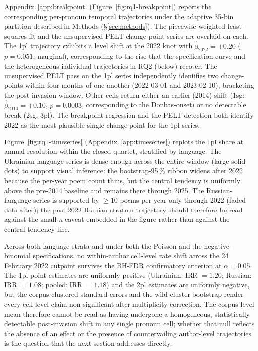 \documentclass[12pt]{interact}
\theoremstyle{plain}%
\theoremstyle{definition}
\theoremstyle{remark}
\begin{document}
Appendix~\ref{app:breakpoint} (Figure~\ref{fig:rq1-breakpoint}) reports the corresponding per-pronoun temporal trajectories under the adaptive 35-bin partition described in Methods (\S\ref{sec:methods}). The piecewise weighted-least-squares fit and the unsupervised PELT change-point series are overlaid on each. The 1pl trajectory exhibits a level shift at the 2022 knot with $\hat{\beta}_{2022} = +0.20$ ($p = 0.051$, marginal), corresponding to the rise that the specification curve and the heterogeneous individual trajectories in RQ2 (below) recover. The unsupervised PELT pass on the 1pl series independently identifies two change-points within four months of one another (2022-03-01 and 2023-02-10), bracketing the post-invasion window. Other cells return either an earlier (2014) shift (1sg: $\hat{\beta}_{2014} = +0.10$, $p = 0.0003$, corresponding to the Donbas-onset) or no detectable break (2sg, 3pl). The breakpoint regression and the PELT detection both identify 2022 as the most plausible single change-point for the 1pl series.

Figure~\ref{fig:rq1-timeseries} (Appendix~\ref{app:timeseries}) replots the 1pl share at annual resolution within the closed quartet, stratified by language. The Ukrainian-language series is dense enough across the entire window (large solid dots) to support visual inference: the bootstrap-95\,\% ribbon widens after 2022 because the per-year poem count thins, but the central tendency is uniformly above the pre-2014 baseline and remains there through 2025. The Russian-language series is supported by $\geq 10$ poems per year only through 2022 (faded dots after); the post-2022 Russian-stratum trajectory should therefore be read against the small-$n$ caveat embedded in the figure rather than against the central-tendency line.

Across both language strata and under both the Poisson and the negative-binomial specifications, no within-author cell-level rate shift across the 24 February 2022 cutpoint survives the BH-FDR confirmatory criterion at $\alpha = 0.05$. The 1pl point estimates are uniformly positive (Ukrainian: IRR $= 1.20$; Russian: IRR $= 1.08$; pooled: IRR $= 1.18$) and the 2pl estimates are uniformly negative, but the corpus-clustered standard errors and the wild-cluster bootstrap render every cell-level claim non-significant after multiplicity correction. The corpus-level mean therefore cannot be read as having undergone a homogeneous, statistically detectable post-invasion shift in any single pronoun cell; whether that null reflects the absence of an effect or the presence of countervailing author-level trajectories is the question that the next section addresses directly.
\end{document}
